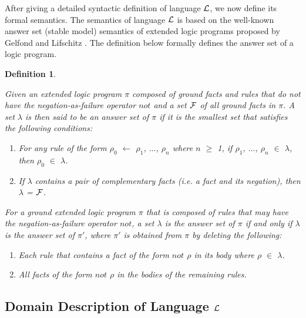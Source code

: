\documentclass[11pt]{report}
\newtheorem{vdefinition}{Definition}[chapter]
\begin{document}
      After giving a detailed syntactic definition of language ${\cal L}$,
      we now define its formal semantics. The semantics of language
      ${\cal L}$ is based on the well-known answer set (stable model)
      semantics of extended logic programs proposed by Gelfond and Lifschitz
      \cite{GEL}. The definition below formally defines the answer set of a
      logic program.

      \begin{vdefinition}
        \label{defn-langl-ansrs}

        Given an extended logic program $\pi$ composed of ground facts and
        rules that do not have the negation-as-failure operator $not$ and a
        set ${\cal F}$ of all ground facts in $\pi$. A set $\lambda$ is
        then said to be an answer set of $\pi$ if it is the smallest set
        that satisfies the following conditions:

        \begin{enumerate}
          \item
            For any rule of the form $\rho_{0}$ $\leftarrow$ $\rho_{1}$,
            $\hdots$, $\rho_{n}$ where $n$ $\geq$ 1, if $\rho_{1}$, $\hdots$,
            $\rho_{n}$ $\in$ $\lambda$, then
            $\rho_{0}$ $\in$ $\lambda$.

          \item
            If $\lambda$ contains a pair of complementary facts (i.e. a fact
            and its negation), then $\lambda$ = ${\cal F}$.
        \end{enumerate}

        For a ground extended logic program $\pi$ that is composed of rules
        that may have the negation-as-failure operator $not$, a set $\lambda$
        is the answer set of $\pi$ if and only if $\lambda$ is the answer set
        of $\pi'$, where $\pi'$ is obtained from $\pi$ by deleting the
        following:

        \begin{enumerate}
          \item
            Each rule that contains a fact of the form $not$ $\rho$ in its
            body where $\rho$ $\in$ $\lambda$.
          \item
            All facts of the form $not$ $\rho$ in the bodies of the remaining
            rules.
        \end{enumerate}
      \end{vdefinition}

      \subsection{Domain Description of Language ${\cal L}$}
        \label{subs-langl-domai}
\end{document}
